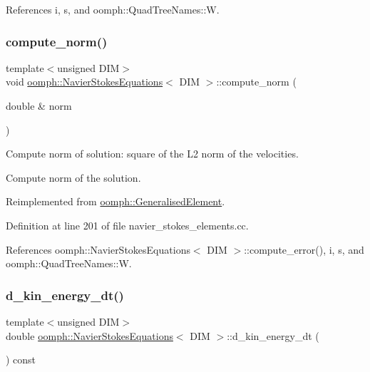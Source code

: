 References i, s, and oomph\+::\+Quad\+Tree\+Names\+::W.

\mbox{\label{classoomph_1_1NavierStokesEquations_a929b419d4927aafeee72de9d5da9e595}} 
\subsubsection{\texorpdfstring{compute\+\_\+norm()}{compute\_norm()}}
{\footnotesize\ttfamily template$<$unsigned D\+IM$>$ \\
void \hyperlink{classoomph_1_1NavierStokesEquations}{oomph\+::\+Navier\+Stokes\+Equations}$<$ D\+IM $>$\+::compute\+\_\+norm (\begin{DoxyParamCaption}\item[{double \&}]{norm }\end{DoxyParamCaption})\hspace{0.3cm}{\ttfamily [virtual]}}



Compute norm of solution\+: square of the L2 norm of the velocities. 

Compute norm of the solution. 

Reimplemented from \hyperlink{classoomph_1_1GeneralisedElement_af2025a472df6752a946739da58e7fb37}{oomph\+::\+Generalised\+Element}.



Definition at line 201 of file navier\+\_\+stokes\+\_\+elements.\+cc.



References oomph\+::\+Navier\+Stokes\+Equations$<$ D\+I\+M $>$\+::compute\+\_\+error(), i, s, and oomph\+::\+Quad\+Tree\+Names\+::W.

\mbox{\label{classoomph_1_1NavierStokesEquations_a86da10e50c1133b614f3f28b38b798c2}} 
\subsubsection{\texorpdfstring{d\+\_\+kin\+\_\+energy\+\_\+dt()}{d\_kin\_energy\_dt()}}
{\footnotesize\ttfamily template$<$unsigned D\+IM$>$ \\
double \hyperlink{classoomph_1_1NavierStokesEquations}{oomph\+::\+Navier\+Stokes\+Equations}$<$ D\+IM $>$\+::d\+\_\+kin\+\_\+energy\+\_\+dt (\begin{DoxyParamCaption}{ }\end{DoxyParamCaption}) const}




